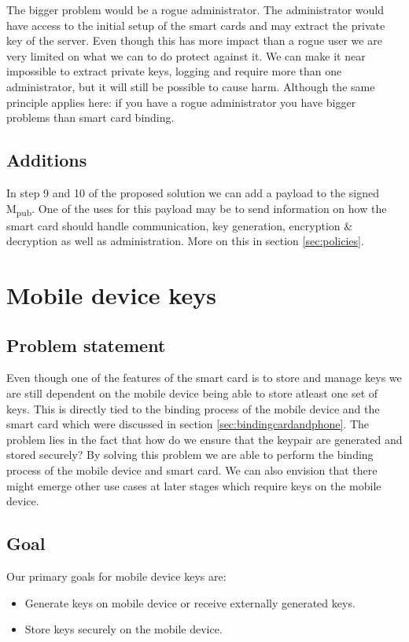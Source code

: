 The bigger problem would be a rogue administrator. The administrator would have access to the initial setup of the smart cards and may extract the private key of the server. Even though this has more impact than a rogue user we are very limited on what we can to do protect against it. We can make it near impossible to extract private keys, logging and require more than one administrator, but it will still be possible to cause harm. Although the same principle applies here: if you have a rogue administrator you have bigger problems than smart card binding.


\subsection{Additions}
In step 9 and 10 of the proposed solution we can add a payload to the signed M\textsubscript{pub}. One of the uses for this payload may be to send information on how the smart card should handle communication, key generation, encryption \& decryption as well as administration. More on this in section \ref{sec:policies}.


\section{Mobile device keys}
\label{sec:mobileDeviceKeys}


\subsection{Problem statement}
Even though one of the features of the smart card is to store and manage keys we are still dependent on the mobile device being able to store atleast one set of keys. This is directly tied to the binding process of the mobile device and the smart card which were discussed in section \ref{sec:bindingcardandphone}. The problem lies in the fact that how do we ensure that the keypair are generated and stored securely? By solving this problem we are able to perform the binding process of the mobile device and smart card. We can also envision that there might emerge other use cases at later stages which require keys on the mobile device.

\subsection{Goal}
Our primary goals for mobile device keys are:

\begin{itemize}
  \item Generate keys on mobile device or receive externally generated keys.
  \item Store keys securely on the mobile device.
\end{itemize}

